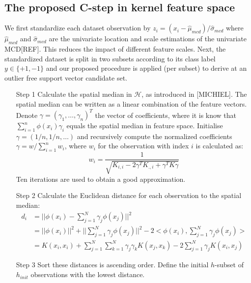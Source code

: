 \documentclass[preprint,12pt]{elsarticle}
\begin{document}
\subsection{The proposed C-step in kernel feature space}

We first standardize each dataset observation by $z_i = (x_i - \hat{\mu}_{mcd}) / \hat{\sigma}_{mcd}$ where $\hat{\mu}_{mcd}$ and $\hat{\sigma}_{mcd}$ are the univariate location and scale estimations of the univariate MCD[REF]. This reduces the impact of different feature scales. Next, the standardized dataset is split in two subsets according to its class label $y \in \{+1, -1\}$ and our proposed  procedure is applied (per subset) to derive at an outlier free support vector candidate set. 

\begin{itemize}
	\item [Step 1] Calculate the spatial median in $\mathcal{H}$, as introduced in [MICHIEL]. The spatial median can be written as a linear combination of the feature vectors. Denote $\gamma = (\gamma_1, \dots, \gamma_n)^T$ the vector of coefficients, where it is know that $\sum_{i=1}^{n} \phi(x_i) \gamma_i$ equals the spatial median in feature space. Initialise $\gamma = (1/n, 1/n, \dots)$ and recursively compute the normalized coefficients $\gamma = w / \sum_{i=1}^{n}w_i$, where $w_i$ for the observation with index $i$ is calculated as:
	\begin{equation}
		w_i = \frac{1}{\sqrt{ K_{i,i} - 2 \gamma^T K_{., i} + \gamma^T K \gamma}}
	\end{equation}
	Ten iterations are used to obtain a good approximation.	
	\item [Step 2] Calculate the Euclidean distance for each observation to the spatial median:
	\begin{align}
	d_i &= || \phi(x_i) - \sum_{j=1}^N \gamma_j \phi(x_j)||^2 \\
	&= || \phi(x_i)||^2 + || \sum_{j=1}^N \gamma_j \phi(x_j)||^2 - 2 <\phi(x_i),\sum_{j=1}^N \gamma_j \phi(x_j)> \\
	&= K(x_i,x_i) + \sum_{j=1}^N \sum_{k=1}^N \gamma_j \gamma_k K(x_j,x_k) - 2 \sum_{j=1}^N\gamma_j K(x_i,x_j)
	\end{align}
	\item [Step 3] 	Sort these distances is ascending order. Define the initial $h$-subset of $h_{init}$ observations with the lowest distance.	


\end{itemize}
\end{document}
